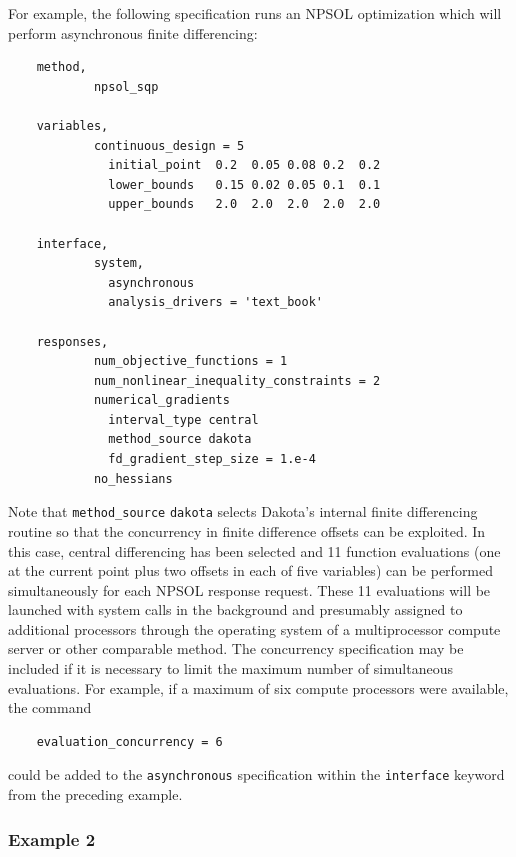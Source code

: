 For example, the following specification runs an NPSOL optimization
which will perform asynchronous finite differencing:
\begin{small}
\begin{verbatim}
    method,
            npsol_sqp

    variables,
            continuous_design = 5
              initial_point  0.2  0.05 0.08 0.2  0.2
              lower_bounds   0.15 0.02 0.05 0.1  0.1
              upper_bounds   2.0  2.0  2.0  2.0  2.0

    interface,
            system,
              asynchronous
              analysis_drivers = 'text_book'

    responses,
            num_objective_functions = 1
            num_nonlinear_inequality_constraints = 2
            numerical_gradients
              interval_type central
              method_source dakota
              fd_gradient_step_size = 1.e-4
            no_hessians
\end{verbatim}
\end{small}

Note that \texttt{method\_source} \texttt{dakota} selects Dakota's
internal finite differencing routine so that the concurrency in finite
difference offsets can be exploited. In this case, central
differencing has been selected and 11 function evaluations (one at the
current point plus two offsets in each of five variables) can be
performed simultaneously for each NPSOL response request. These 11
evaluations will be launched with system calls in the background and
presumably assigned to additional processors through the operating
system of a multiprocessor compute server or other comparable method.
The concurrency specification may be included if it is necessary to
limit the maximum number of simultaneous evaluations. For example, if
a maximum of six compute processors were available, the command
\begin{small}
\begin{verbatim}
    evaluation_concurrency = 6
\end{verbatim}
\end{small}
could be added to the \texttt{asynchronous} specification within the
\texttt{interface} keyword from the preceding example.

\subsubsection{Example 2}\label{parallel:spec:single:example2}

